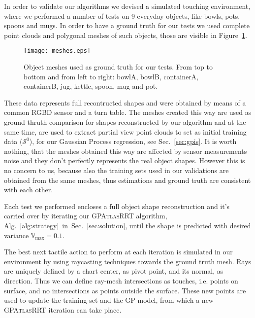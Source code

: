 
In order to validate our algorithms we devised a simulated touching environment,
where we performed a number of tests on 9 everyday objects, like bowls, pots, spoons and mugs.
In order to have a ground truth for our tests we used complete point clouds and polygonal meshes of
such objects, those are visible in Figure~\ref{fig:meshes}.

\begin{figure}[htb]
    \centering
    \texttt{[image: meshes.eps]}
    \caption{Object meshes used as ground truth for our tests. From top to bottom and from left
    to right: bowlA, bowlB, containerA, containerB, jug, kettle, spoon, mug and pot.}
    \label{fig:meshes}
\end{figure}

These data represents full recontructed shapes and were obtained by means of a common
RGBD sensor and a turn table. The meshes created this way are used as ground thruth 
comparison for shapes reconstructed by our algorithm and at the same time,
are used to extract  partial view point clouds to set as initial training
data ($\mathcal{S}^0$), for our Gaussian Process regression, see Sec.~\ref{sec:gpis}.
It is worth nothing, that the meshes obtained this way are affected by sensor measurements noise 
and they don't perfectly represents the real object shapes. However this is no concern to us, because also the
training sets used in our validations are obtained from the same meshes, thus estimations and ground truth are
consistent with each other.

Each test we performed encloses a full object shape reconstruction and it's carried over
by iterating our \textsc{GPAtlasRRT} algorithm, Alg.~\ref{alg:strategy}~in~Sec.~\ref{sec:solution},
until the shape is predicted with desired variance $\mathbb{V}_{\max} = 0.1$.

The best next tactile action to perform at each iteration is simulated in our
environment by using  raycasting techniques towards the ground truth mesh.
Rays are uniquely defined by a chart center, as pivot point, and its normal, as direction.
Thus we can define  ray-mesh intersections as touches, i.e. points on surface, and no intersections
as points outside the surface. These new points are used to update the training set
and the GP model, from which a new \textsc{GPAtlasRRT} iteration can take place. 

